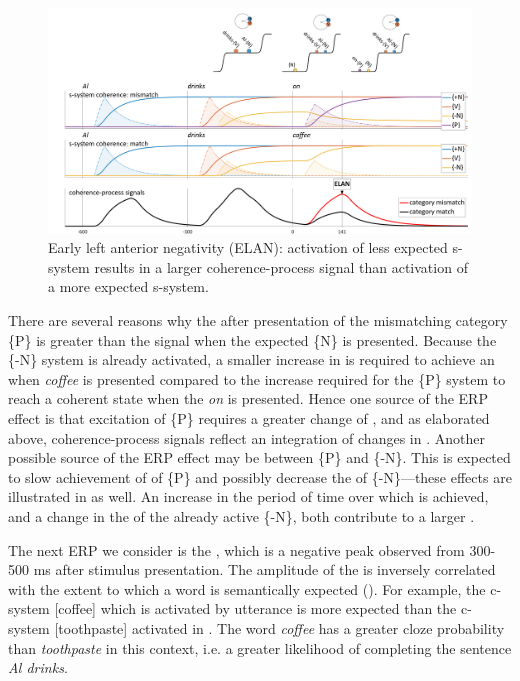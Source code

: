   
\begin{figure}
\includegraphics[width=\textwidth]{figures/Tilsen-img142.png}
\caption{Early left anterior negativity (ELAN): activation of less expected s-system results in a larger coherence-process signal than activation of a more expected s-system.}
\label{fig:6:23}
\end{figure}
 

There are several reasons why the  after presentation of the mismatching category \{P\} is greater than the signal when the expected \{N\} is presented. Because the \{-N\} system is already activated, a smaller increase in  is required to achieve an  when \textit{coffee} is presented compared to the increase required for the \{P\} system to reach a coherent state when the  \textit{on} is presented. Hence one source of the ERP effect is that excitation of \{P\} requires a greater change of , and as elaborated above, coherence-process signals reflect an integration of changes in . Another possible source of the ERP effect may be  between \{P\} and \{-N\}. This  is expected to slow achievement of  of \{P\} and possibly decrease the  of \{-N\}—these effects are illustrated in {} as well. An increase in the period of time over which  is achieved, and a change in the  of the already active \{-N\}, both contribute to a larger .

  The next ERP we consider is the , which is a negative peak observed from 300-500 ms after stimulus presentation. The amplitude of the  is inversely correlated with the extent to which a word is semantically expected (\citealt{FedermeierLaszlo2009,Friederici2002,KutasFedermeier2011}). For example, the c-system [coffee] which is activated by utterance  is more expected than the c-system [toothpaste] activated in . The word \textit{coffee} has a greater cloze probability than \textit{toothpaste} in this context, i.e. a greater likelihood of completing the sentence \textit{Al drinks}.

